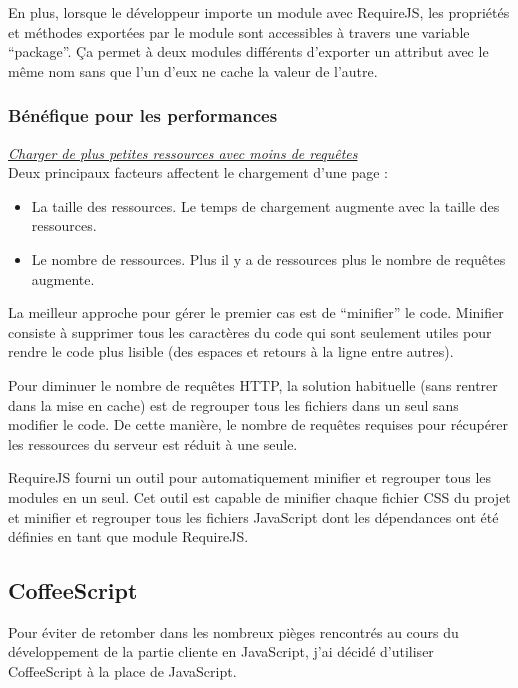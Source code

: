 En plus, lorsque le développeur importe un module avec RequireJS, les propriétés
et méthodes exportées par le module sont accessibles à travers une variable
``package''. Ça permet à deux modules différents d'exporter un attribut avec le
même nom sans que l'un d'eux ne cache la valeur de l'autre.

\subsubsection{Bénéfique pour les performances}

\textit{\underline{Charger de plus petites ressources avec moins de requêtes}}\\

Deux principaux facteurs affectent le chargement d'une page :
\begin{itemize}
\item La taille des ressources. Le temps de chargement augmente avec la taille
  des ressources.
\item Le nombre de ressources. Plus il y a de ressources plus le nombre de
  requêtes augmente.
\end{itemize}

La meilleur approche pour gérer le premier cas est de ``minifier'' le code.
Minifier consiste à supprimer tous les caractères du code qui sont seulement
utiles pour rendre le code plus lisible (des espaces et retours à la ligne
entre autres).

Pour diminuer le nombre de requêtes HTTP, la solution habituelle (sans rentrer
dans la mise en cache) est de regrouper tous les fichiers dans un seul sans
modifier le code. De cette manière, le nombre de requêtes requises pour
récupérer les ressources du serveur est réduit à une seule.

RequireJS fourni un outil pour automatiquement minifier et
regrouper tous les modules en un seul. Cet outil est capable de minifier chaque
fichier CSS du projet et minifier et regrouper tous les fichiers JavaScript dont
les dépendances ont été définies en tant que module RequireJS.

\subsection{CoffeeScript}

Pour éviter de retomber dans les nombreux pièges rencontrés au cours du
développement de la partie cliente en JavaScript, j'ai décidé d'utiliser
CoffeeScript à la place de JavaScript.

